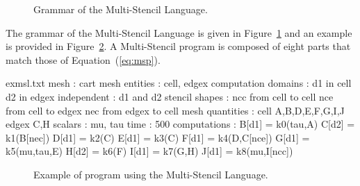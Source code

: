 \begin{figure}[hbt]
  \hspace{5mm}
  \begin{minipage}[!h]{0.98\textwidth}
    {}   
    \caption{Grammar of the Multi-Stencil Language. \label{fig:grammar}}
  \end{minipage}
\end{figure}

The grammar of the Multi-Stencil Language is given in Figure~\ref{fig:grammar} and an example is provided in Figure~\ref{fig:exmsl}. A Multi-Stencil program is composed of eight parts that match those of Equation~(\ref{eq:msp}).

\begin{filecontents*}{exmsl.txt}
mesh : cart
mesh entities : cell, edgex
computation domains :
  d1 in cell
  d2 in edgex
independent :
  d1 and d2
stencil shapes : 
  ncc from cell to cell
  nce from cell to edgex
  nec from edgex to cell
mesh quantities :
  cell A,B,D,E,F,G,I,J
  edgex C,H
scalars : mu, tau
time : 500
computations :
  B[d1] = k0(tau,A)
  C[d2] = k1(B[nec])
  D[d1] = k2(C)
  E[d1] = k3(C)
  F[d1] = k4(D,C[nce])
  G[d1] = k5(mu,tau,E)
  H[d2] = k6(F)
  I[d1] = k7(G,H)
  J[d1] = k8(mu,I[ncc])
\end{filecontents*}

\begin{figure}[!h]
  \hspace{5mm}
  \begin{minipage}[!h]{0.98\textwidth}
    {}   
    \caption{Example of program using the Multi-Stencil Language. \label{fig:exmsl}}
  \end{minipage}
\end{figure}

